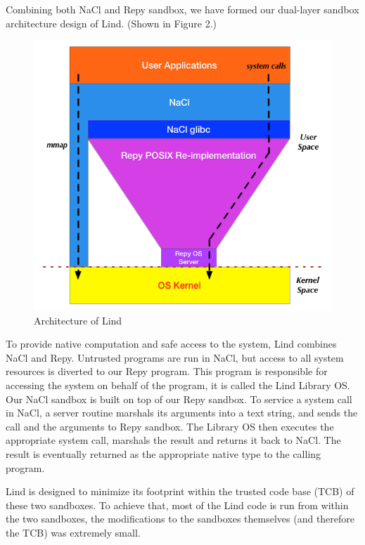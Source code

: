Combining both NaCl and Repy sandbox, we have formed our dual-layer sandbox architecture 
design of Lind. (Shown in Figure 2.)  


\begin{figure}[h]
\centering
\includegraphics[width=1.0\columnwidth]{diagram/lind_architecture.png}
\caption{Architecture of Lind}
\label{fig:arch}
\end{figure}


To provide native computation and safe access to the system, Lind combines NaCl and Repy. 
Untrusted programs are run in NaCl, but access to all system resources is diverted to our Repy program. 
This program is responsible for accessing the system on behalf of the program, it is called the Lind Library OS. 
Our NaCl sandbox is built on top of our Repy sandbox. To service a system call in NaCl, a server routine 
marshals its arguments into a text string, and sends the call and the arguments to Repy sandbox. 
The Library OS then executes the appropriate system call, marshals the result and returns it back to NaCl. 
The result is eventually returned as the appropriate native type to the calling program. 

Lind is designed to minimize its footprint within the trusted code base (TCB) of these two sandboxes. 
To achieve that, most of the Lind code is run from within the two sandboxes, the modifications to 
the sandboxes themselves (and therefore the TCB) was extremely small. 

